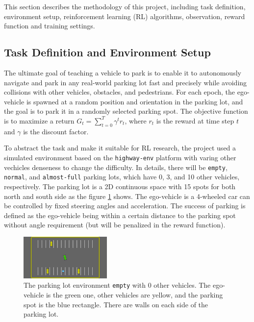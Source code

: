 \documentclass{article}
\begin{document}
This section describes the methodology of this project, including task definition, environment setup, reinforcement learning (RL) algorithms, observation, reward function and training settings.

\subsection{Task Definition and Environment Setup}

The ultimate goal of teaching a vehicle to park is to enable it to autonomously navigate and park in any real-world parking lot fast and precisely while avoiding collisions with other vehicles, obstacles, and pedestrians. For each epoch, the ego-vehicle is spawned at a random position and orientation in the parking lot, and the goal is to park it in a randomly selected parking spot. The objective function is to maximize a return $G_t = \sum_{t=0}^{T} \gamma^t r_t$, where $r_t$ is the reward at time step $t$ and $\gamma$ is the discount factor.

To abstract the task and make it suitable for RL research, the project used a simulated environment based on the \texttt{highway-env} platform \cite{highway-env} with varing other vechicles denseness to change the difficulty. In details, there will be \texttt{empty}, \texttt{normal}, and \texttt{almost-full} parking lots, which have 0, 3, and 10 other vehicles, respectively. The parking lot is a 2D continuous space with 15 spots for both north and south side as the figure \ref{fig:parking_lot} shows. The ego-vehicle is a 4-wheeled car can be controlled by fixed steering angles and acceleration. The success of parking is defined as the ego-vehicle being within a certain distance to the parking spot without angle requirement (but will be penalized in the reward function).

\begin{figure}[h]
  \centering
  \includegraphics[width=0.4\textwidth]{./pics/parking.jpg}
  \caption{The parking lot environment \texttt{empty} with 0 other vehicles. The ego-vehicle is the green one, other vehicles are yellow, and the parking spot is the blue rectangle. There are walls on each side of the parking lot.}
  \label{fig:parking_lot}
\end{figure}
\end{document}
